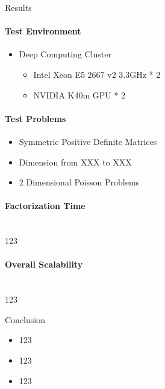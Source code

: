 \documentclass[final]{beamer}
\newlength{\sepwid}
\newlength{\onecolwid}
\begin{document}
\begin{frame}[t]
\begin{columns}[t]
\begin{column}{\onecolwid}
        \begin{block}{Results}
          
          \paragraph{\textbf{Test Environment}}
          \begin{itemize}
            \item Deep Computing Cluster
            \begin{itemize}
              \item Intel Xeon E5 2667 v2 3.3GHz * 2
              \item NVIDIA K40m GPU * 2
            \end{itemize}
          \end{itemize}

          \paragraph{\textbf{Test Problems}}
          \begin{itemize}
            \item Symmetric Positive Definite Matrices
            \item Dimension from XXX to XXX
            \item 2 Dimensional Poisson Problems
          \end{itemize}

          \paragraph{\textbf{Factorization Time}} \\
          123

          \paragraph{\textbf{Overall Scalability}} \\
          123

        \end{block}
        \begin{block}{Conclusion}
          \begin{itemize}
            \item 123
            \item 123
            \item 123
          \end{itemize}
        \end{block}
      \end{column}

      \begin{column}{\sepwid}\end{column}
    \end{columns}
  \end{frame}
\end{document}
